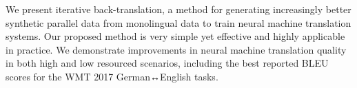 We present iterative back-translation, a method for generating increasingly better synthetic parallel data from monolingual data to train neural machine translation systems. Our proposed method is very simple yet effective and highly applicable in practice. We demonstrate improvements in neural machine translation quality in both high and low resourced scenarios, including the best reported BLEU scores for the WMT 2017 German↔English tasks.
